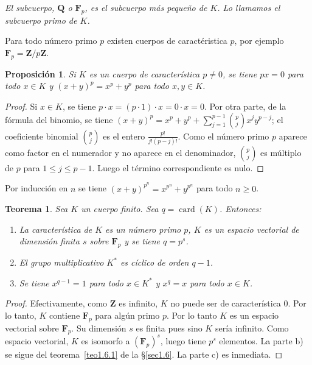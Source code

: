 \documentclass[10pt,oneside,bibtotoc,smallheadings,leqno,a5paper,DIV=12]{scrbook}
\newcommand{\QQ}{\mathbf{Q}}
\newcommand{\ZZ}{\mathbf{Z}}
\newcommand{\FF}{\mathbf{F}}
\DeclareMathOperator{\card}{card}
\numberwithin{equation}{section}
\newenvironment{comm}%
	{\begin{trivlist}\item\small\itshape}
	{\end{trivlist}}
\theoremstyle{defi}
\theoremstyle{enonce}
\newtheorem{theorem}{Teorema}
\newtheorem{proposition}{Proposici\'on}
\theoremstyle{rem}
\numberwithin{theorem}{section}
\numberwithin{proposition}{section}
\numberwithin{definition}{section}
\numberwithin{lemma}{section}
\numberwithin{corollary}{section}
\numberwithin{example}{section}
\numberwithin{footnote}{section}%
\begin{document}
\begin{comm}
El subcuerpo, $\QQ$ o $\FF_{p}$, es el subcuerpo m\'as
peque\~no de $K$. Lo llamamos el {\em subcuerpo primo} de $K$.

Para todo n\'umero primo $p$ existen cuerpos de caract\'eristica $p$,
por ejemplo $\FF_{p} = \ZZ/p\ZZ$.
\end{comm}

\begin{proposition}\label{prop1.7.1}
Si $K$ es un cuerpo de caracter\'istica $p\neq 0$, se tiene
$px = 0$ para todo $x\in K$ y $(x+y)^{p} = x^{p}+y^{p}$ para
todo $x, y\in K$.
\end{proposition}

\begin{proof}
Si $x\in K$, se tiene $p\cdot x = (p\cdot 1)\cdot x = 0\cdot x = 0$. Por otra parte,
de la f\'ormula del binomio, se tiene $(x+y)^{p} = x^{p}+y^{p}+\sum_{j=1}^{p-1}\binom{p}{j}x^{j}y^{p-j}$;
el coeficiente binomial $\binom{p}{j}$ es el entero $\frac{p!}{j!(p-j)!}$. Como el n\'umero primo
$p$ aparece como factor en el numerador y no aparece en el denominador, $\binom{p}{j}$ es m\'ultiplo
de $p$ para $1\leq j\leq p-1$. Luego el t\'ermino correspondiente es nulo.
\end{proof}

Por inducci\'on en $n$ se tiene $(x+y)^{p^{n}}=x^{p^{n}}+y^{p^{n}}$ para todo $n\geq 0$.

\begin{theorem}\label{teo1.7.1}
Sea $K$ un cuerpo finito. Sea $q = \card(K)$. Entonces:
\begin{enumerate}%
\item[a)] La caracter\'istica de $K$ es un n\'umero primo $p$, $K$ es un espacio vectorial de
dimensi\'on finita $s$ sobre $\FF_{p}$ y se tiene $q = p^{s}$.
\item[b)] El grupo multiplicativo $K^{*}$ es c\'iclico de orden $q-1$.
\item[c)] Se tiene $x^{q-1} = 1$ para todo $x\in K^{*}$ y $x^{q} = x$ para todo $x\in K$.
\end{enumerate}
\end{theorem}

\begin{proof}
Efectivamente, como $\ZZ$ es infinito, $K$ no puede ser de caracter\'istica $0$. Por lo tanto,
$K$ contiene $\FF_{p}$ para alg\'un primo $p$. Por lo tanto $K$ es un espacio vectorial sobre
$\FF_{p}$. Su dimensi\'on $s$ es finita pues sino $K$ ser\'ia infinito. Como espacio vectorial,
$K$ es isomorfo a $(\FF_{p})^{s}$, luego tiene $p^{s}$ elementos. La parte b) se sigue del
teorema~\ref{teo1.6.1} de la \S\ref{sec1.6}. La parte c) es inmediata.
\end{proof}
\end{document}
